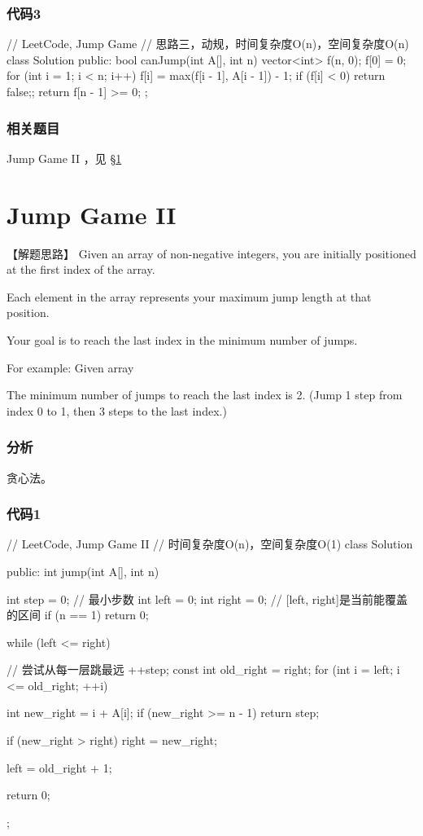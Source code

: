\subsubsection{代码3}
\begin{Code}
	// LeetCode, Jump Game
	// 思路三，动规，时间复杂度O(n)，空间复杂度O(n)
	class Solution {
		public:
		bool canJump(int A[], int n) {
			vector<int> f(n, 0);
			f[0] = 0;
			for (int i = 1; i < n; i++) {
				f[i] = max(f[i - 1], A[i - 1]) - 1;
				if (f[i] < 0) return false;;
			}
			return f[n - 1] >= 0;
		}
	};
\end{Code}


\subsubsection{相关题目}
\begindot
\item Jump Game II ，见 \S \ref{sec:jump-game-ii}
\myenddot


\section{Jump Game II} %
\label{sec:jump-game-ii}


【解题思路】
Given an array of non-negative integers, you are initially positioned at the first index of the array.

Each element in the array represents your maximum jump length at that position.

Your goal is to reach the last index in the minimum number of jumps.

For example:
Given array 

The minimum number of jumps to reach the last index is 2. (Jump 1 step from index 0 to 1, then 3 steps to the last index.)


\subsubsection{分析}
贪心法。


\subsubsection{代码1}
\begin{Code}
	// LeetCode, Jump Game II
	// 时间复杂度O(n)，空间复杂度O(1)
	class Solution {
		public:
		int jump(int A[], int n) {
			int step = 0; // 最小步数
			int left = 0;
			int right = 0;  // [left, right]是当前能覆盖的区间
			if (n == 1) return 0;
			
			while (left <= right) { // 尝试从每一层跳最远
				++step;
				const int old_right = right;
				for (int i = left; i <= old_right; ++i) {
					int new_right = i + A[i];
					if (new_right >= n - 1) return step;
					
					if (new_right > right) right = new_right;
				}
				left = old_right + 1;
			}
			return 0;
		}
	};
\end{Code}


